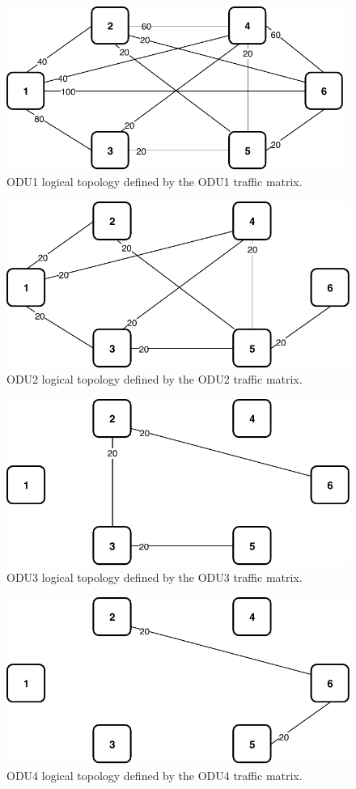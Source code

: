 \begin{figure}[h!]
\centering
\includegraphics[width=11cm]{sdf/ilp/translucent_protection/figures/logical_topology_ODU1_high}
\caption{ODU1 logical topology defined by the ODU1 traffic matrix.}
\label{logical3_ODU1_protectionhigh}
\end{figure}
\newpage
\begin{figure}[h!]
\centering
\includegraphics[width=12cm]{sdf/ilp/translucent_protection/figures/logical_topology_ODU2_high}
\caption{ODU2 logical topology defined by the ODU2 traffic matrix.}
\label{logical3_ODU2_protectionhigh}
\end{figure}

\begin{figure}[h!]
\centering
\includegraphics[width=12cm]{sdf/ilp/translucent_protection/figures/logical_topology_ODU3_high}
\caption{ODU3 logical topology defined by the ODU3 traffic matrix.}
\label{logical3_ODU3_protectionhigh}
\end{figure}

\begin{figure}[h!]
\centering
\includegraphics[width=12cm]{sdf/ilp/translucent_protection/figures/logical_topology_ODU4_high}
\caption{ODU4 logical topology defined by the ODU4 traffic matrix.}
\label{logical3_ODU4_protectionhigh}
\end{figure}

